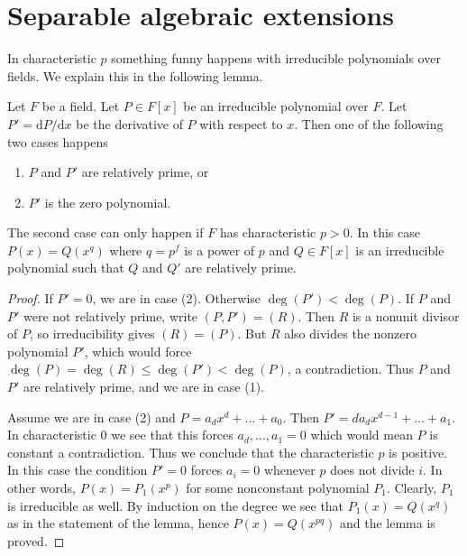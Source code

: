 \section{Separable algebraic extensions}
\label{section-separable-extensions}

\noindent
In characteristic $p$ something funny happens with irreducible polynomials
over fields. We explain this in the following lemma.

\begin{lemma}
\label{lemma-irreducible-polynomials}
Let $F$ be a field. Let $P \in F[x]$ be an irreducible polynomial over $F$.
Let $P' = \text{d}P/\text{d}x$ be the derivative of $P$ with respect
to $x$. Then one of the following two cases happens
\begin{enumerate}
\item $P$ and $P'$ are relatively prime, or
\item $P'$ is the zero polynomial.
\end{enumerate}
The second case can only happen if $F$ has characteristic $p > 0$.
In this case $P(x) = Q(x^q)$ where $q = p^f$ is a power of $p$ and
$Q \in F[x]$ is an irreducible polynomial such that $Q$ and $Q'$
are relatively prime.
\end{lemma}

\begin{proof}
If $P' = 0$, we are in case (2). Otherwise
$\deg(P') < \deg(P)$. If $P$ and $P'$ were not relatively prime,
write $(P, P') = (R)$. Then $R$ is a nonunit divisor of $P$,
so irreducibility gives $(R) = (P)$. But $R$ also divides the
nonzero polynomial $P'$, which would force
$\deg(P) = \deg(R) \leq \deg(P') < \deg(P)$, a contradiction.
Thus $P$ and $P'$ are relatively prime, and we are in case (1).

\medskip\noindent
Assume we are in case (2) and $P = a_d x^d + \ldots + a_0$. Then
$P' = da_d x^{d - 1} + \ldots + a_1$. In characteristic $0$ we see
that this forces $a_d, \ldots, a_1 = 0$ which would mean $P$ is constant
a contradiction. Thus we conclude that the characteristic $p$ is positive.
In this case the condition $P' = 0$ forces $a_i = 0$ whenever $p$ does
not divide $i$.
In other words, $P(x) = P_1(x^p)$ for some nonconstant polynomial $P_1$.
Clearly, $P_1$ is irreducible as well. By induction on the degree we
see that $P_1(x) = Q(x^q)$ as in the statement of the lemma, hence
$P(x) = Q(x^{pq})$ and the lemma is proved.
\end{proof}

